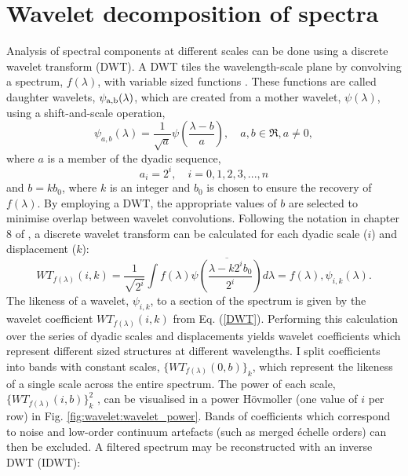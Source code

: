 \iffalse
\section{Wavelet decomposition of spectra}\label{theory:wavelet_decomp}

Analysis of spectral components at different scales can be done using a discrete wavelet transform (DWT). A DWT tiles the wavelength-scale plane by convolving a spectrum, $f( \lambda )$, with variable sized functions \citep{2012AAS...22033004S}. These functions are called daughter wavelets, $\psi_{\rm a,b}(\lambda)$, which are created from a mother wavelet, $\psi(\lambda )$,  using a shift-and-scale operation,
%
\begin{equation}\label{daugthermother}
\psi_{a,b}(\lambda) = \frac{1}{\sqrt{a}}\psi(\frac{\lambda - b}{a}),\quad a,b \in  \Re, a \neq 0 ,
\end{equation}
%
where  $a$ is a member of the dyadic sequence,
%
\begin{equation}\label{dyadic}
a_{i} = 2^{i}, \quad i = 0,1,2,3,...,n
\end{equation}
%
and $b=kb_{0}$, where $k$ is an integer and $b_0$ is chosen to ensure the recovery of $f(\lambda)$. By employing a DWT, the appropriate values of $b$ are selected to minimise overlap between wavelet convolutions. Following the notation in chapter 8 of \citet{Olkkonen2011}, a discrete wavelet transform can be calculated for each dyadic scale ($i$) and displacement ($k$):
%
\begin{equation}\label{DWT}
WT_{f(\lambda)}(i,k) = \frac{1}{\sqrt{2^i}} \int f(\lambda)\overline{\psi \left(\frac{\lambda - k2^ib_0}{2^i} \right)} d\lambda = f(\lambda),\psi_{i,k}(\lambda)
.\end{equation}
%
The likeness of a wavelet, $\psi_{i,k}$, to a section of the spectrum is given by the wavelet coefficient $WT_{f(\lambda)}(i,k)$ from Eq. (\ref{DWT}). Performing this calculation over the series of dyadic scales and displacements yields wavelet coefficients which represent different sized structures at different wavelengths. I split coefficients into bands with constant scales, $\lbrace WT_{f(\lambda)}(0,b)\rbrace_k$, which represent the likeness of a single scale across the entire spectrum. The power of each scale, $\lbrace WT_{f(\lambda)}(i,b)\rbrace_k^2$ , can be visualised in a power H\"{o}vmoller (one value of $i$ per row) in Fig. \ref{fig:wavelet:wavelet_power}. Bands of coefficients which correspond to noise and low-order continuum artefacts (such as merged \'{e}chelle orders) can then be excluded. A filtered spectrum may be reconstructed with an inverse DWT (IDWT):
